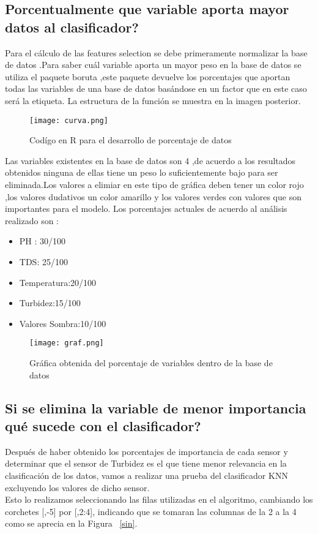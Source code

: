 \documentclass[10pt,a4paper]{article}
\begin{document}
\subsection{Porcentualmente que variable aporta mayor datos al clasificador?}
Para el cálculo de las features selection se debe primeramente normalizar la base de datos .Para saber cuál variable aporta un mayor peso en la base de datos se utiliza el paquete boruta ,este paquete devuelve los porcentajes que aportan todas las variables de una base de datos basándose en un factor que en este caso será la etiqueta. La estructura de la función se muestra en la imagen posterior.
\begin{figure}[H]
\centering
\texttt{[image: curva.png]}
\caption{Codígo en R para el desarrollo de porcentaje de datos}
\label{esquematic}
\end{figure}
Las variables existentes en la base de datos  son 4 ,de acuerdo a los resultados obtenidos ninguna de ellas tiene un peso lo suficientemente bajo para ser eliminada.Los valores a elimiar en este tipo de gráfica deben tener un color rojo ,los valores dudativos un color amarillo y los valores verdes con valores que son importantes para el modelo.
 Los porcentajes actuales de acuerdo al análisis realizado son :\\
\begin{itemize}
\item PH : 30/100
\item TDS: 25/100
\item Temperatura:20/100
\item Turbidez:15/100
\item Valores Sombra:10/100
\end{itemize}
\begin{figure}[H]
\centering
\texttt{[image: graf.png]}
\caption{Gráfica obtenida del porcentaje de variables dentro de la base de datos }
\label{esquematic}
\end{figure}

\subsection{Si se elimina la variable de menor importancia qué sucede con el clasificador?}
Después de haber obtenido los porcentajes de importancia de cada sensor y determinar que el sensor de Turbidez es el que tiene menor relevancia en la clasificación de los datos, vamos a realizar una prueba del clasificador KNN excluyendo los valores de dicho sensor.\\
Esto lo realizamos seleccionando las filas utilizadas en el algoritmo, cambiando los corchetes [,-5] por [,2:4], indicando que se tomaran las columnas de la 2 a la 4 como se aprecia en la Figura ~\ref{sin}.
\end{document}
